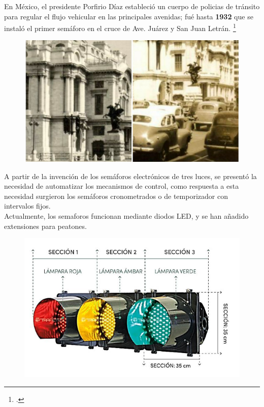 \documentclass[
	11pt, %
]{beamer}
\begin{document}
\begin{frame}
  \bigskip %
  En México, el presidente Porfirio Díaz estableció un cuerpo de policias de tránsito para regular el flujo vehicular en las principales avenidas; fué hasta \textbf{1932} que se instaló el primer semáforo en el cruce de Ave. Juárez y San Juan Letrán. \footcite{tesis}

  \begin{figure}
    \includegraphics[width=0.5\linewidth]{primer_semaforo_mex.jpg}
  \end{figure}
  
\end{frame}
\begin{frame}
  A partir de la invención de los semáforos electrónicos de tres luces, se presentó la necesidad de automatizar los mecanismos de control, como respuesta a esta necesidad surgieron los semáforos cronometrados o de temporizador con intervalos fijos.\\

  Actualmente, los semaforos funcionan mediante diodos LED, y se han añadido extensiones para peatones.

  \begin{figure}
    \includegraphics[width=0.5\linewidth]{semaforos.png}
  \end{figure}
  
\end{frame}
\end{document}
